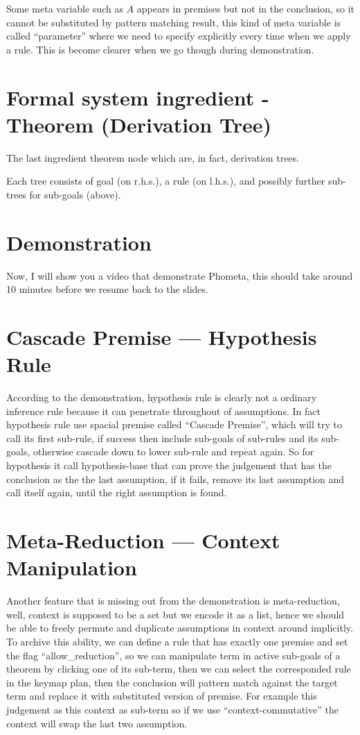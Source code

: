\documentclass[11pt, a4paper]{article}
\begin{document}
Some meta variable such as $A$ appears in premises but not in the conclusion, so
it cannot be substituted by pattern matching result, this kind of meta variable
is called ``parameter'' where we need to specify explicitly every time when we
apply a rule. This is become clearer when we go though during demonstration.

\section{Formal system ingredient - Theorem (Derivation Tree)}

The last ingredient theorem node which are, in fact, derivation trees.

Each tree consists of goal (on r.h.s.), a rule (on l.h.s.), and possibly further
sub-trees for sub-goals (above).

\section{Demonstration}

Now, I will show you a video that demonstrate Phometa, this should take around
10 minutes before we resume back to the slides.

\section{Cascade Premise --- Hypothesis Rule}

According to the demonstration, hypothesis rule is clearly not a ordinary
inference rule because it can penetrate throughout of assumptions. In fact
hypothesis rule use spacial premise called ``Cascade Premise'', which will try
to call its first sub-rule, if success then include sub-goals of sub-rules and
its sub-goals, otherwise cascade down to lower sub-rule and repeat again. So for
hypothesis it call hypothesis-base that can prove the judgement that has the
conclusion as the the last assumption, if it fails, remove its last assumption
and call itself again, until the right assumption is found.

\section{Meta-Reduction --- Context Manipulation}

Another feature that is missing out from the demonstration is meta-reduction,
well, context is supposed to be a set but we encode it as a list, hence we
should be able to freely permute and duplicate assumptions in context around
implicitly. To archive this ability, we can define a rule that has exactly one
premise and set the flag ``allow\_reduction'', so we can manipulate term in active
sub-goals of a theorem by clicking one of its sub-term, then we can select the
corresponded rule in the keymap plan, then the conclusion will pattern match
against the target term and replace it with substituted version of premise. For
example this judgement as this context as sub-term so if we use
``context-commutative'' the context will swap the last two assumption.
\end{document}
